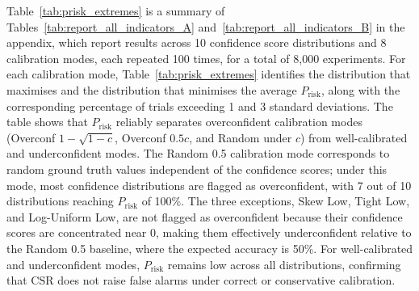 \documentclass{article}
\theoremstyle{plain}
\theoremstyle{definition}
\theoremstyle{remark}
\begin{document}
Table~\ref{tab:prisk_extremes} is a summary of Tables~\ref{tab:report_all_indicators_A} and~\ref{tab:report_all_indicators_B} in the appendix, which report results across 10 confidence score distributions and 8 calibration modes, each repeated 100 times, for a total of 8,000 experiments. For each calibration mode, Table~\ref{tab:prisk_extremes} identifies the distribution that maximises and the distribution that minimises the average $P_{\mathrm{risk}}$, along with the corresponding percentage of trials exceeding 1 and 3 standard deviations. The table shows that $P_{\mathrm{risk}}$ reliably separates overconfident calibration modes (Overconf $1-\sqrt{1-c}$, Overconf $0.5c$, and Random under $c$) from well-calibrated and underconfident modes. The Random 0.5 calibration mode corresponds to random ground truth values independent of the confidence scores; under this mode, most confidence distributions are flagged as overconfident, with 7 out of 10 distributions reaching $P_{\mathrm{risk}}$ of 100\%. The three exceptions, Skew Low, Tight Low, and Log-Uniform Low, are not flagged as overconfident because their confidence scores are concentrated near 0, making them effectively underconfident relative to the Random 0.5 baseline, where the expected accuracy is 50\%. For well-calibrated and underconfident modes, $P_{\mathrm{risk}}$ remains low across all distributions, confirming that $\mathrm{CSR}$ does not raise false alarms under correct or conservative calibration.
\end{document}

